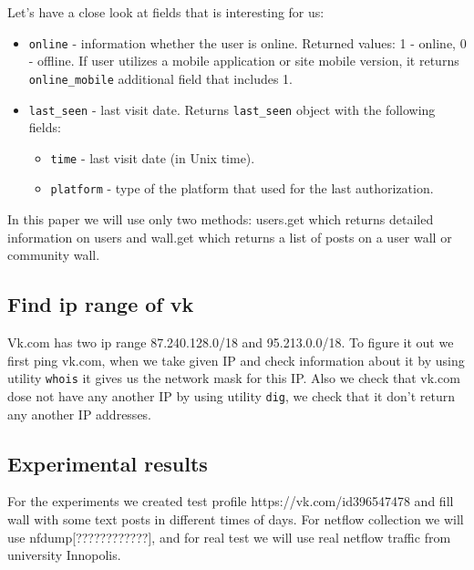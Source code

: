 Let’s have a close look at fields that is interesting for us:
\begin{itemize}
	\item{\texttt{online} - information whether the user is online.  Returned values: 1 - online, 0 - offline.  If user utilizes a mobile application or site mobile version, it returns \texttt{online{\_}mobile} additional field that includes 1.}  
	\item{\texttt{last{\_}seen}	 - last visit date.  Returns \texttt{last{\_}seen} object with the following fields:
	\begin{itemize}
		\item{\texttt{time} - last visit date (in Unix time).}
		\item{\texttt{platform} - type of the platform that used for the last authorization.}
	\end{itemize}}
\end{itemize}

In this paper we will use only two methods: users.get which returns detailed information on users and wall.get which returns a list of posts on a user wall or community wall.


\subsection{Find ip range of vk}
Vk.com has two ip range 87.240.128.0/18 and 95.213.0.0/18. To figure it out we first ping vk.com, when we take given IP and check information about it by using utility \texttt{whois} it gives us the network mask for this IP. Also we check that vk.com dose not have any another IP by using utility \texttt{dig}, we check that it don't return any another IP addresses.


\subsection{Experimental results}
For the experiments we created test profile https://vk.com/id396547478 and fill wall with some text posts in different times of days. For netflow collection we will use nfdump[????????????], and for real test we will use real netflow traffic from university Innopolis. 
